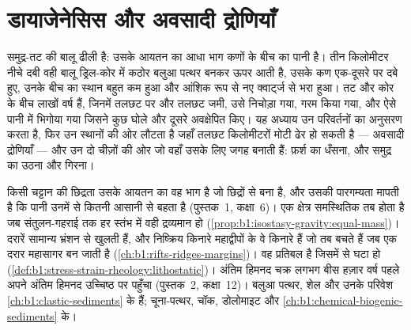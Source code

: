 \chapter{डायाजेनेसिस और अवसादी द्रोणियाँ}\label{ch:b1:diagenesis-basins}

समुद्र-तट की बालू ढीली है: उसके आयतन का आधा भाग कणों के बीच का पानी है। तीन किलोमीटर नीचे दबी वही बालू ड्रिल-कोर में कठोर बलुआ पत्थर बनकर ऊपर आती है, उसके कण एक-दूसरे पर दबे हुए, उनके बीच का स्थान बहुत कम हुआ और आंशिक रूप से नए क्वार्ट्ज से भरा हुआ। तट और कोर के बीच लाखों वर्ष हैं, जिनमें तलछट पर और तलछट जमी, उसे निचोड़ा गया, गरम किया गया, और ऐसे पानी में भिगोया गया जिसने कुछ  घोले और दूसरे अवक्षेपित किए। यह अध्याय उन परिवर्तनों का अनुसरण करता है, फिर उन स्थानों की ओर लौटता है जहाँ तलछट किलोमीटरों मोटी ढेर हो सकती है --- अवसादी द्रोणियाँ --- और उन दो चीज़ों की ओर जो वहाँ उसके लिए जगह बनाती हैं: फ़र्श का धँसना, और समुद्र का उठना और गिरना।

\begin{recall}
किसी चट्टान की छिद्रता उसके आयतन का वह भाग है जो छिद्रों से बना है, और उसकी पारगम्यता मापती है कि पानी उनमें से कितनी आसानी से बहता है (पुस्तक~1, कक्षा~6)। एक क्षेत्र समस्थितिक तब होता है जब संतुलन-गहराई तक हर स्तंभ में वही द्रव्यमान हो (\cref{prop:b1:isostasy-gravity:equal-mass})। दरारें सामान्य भ्रंशन से खुलती हैं, और निष्क्रिय किनारे महाद्वीपों के वे किनारे हैं जो तब बचते हैं जब एक दरार महासागर बन जाती है (\cref{ch:b1:rifts-ridges-margins})।  वह प्रतिबल है जिसमें से  घटा हो (\cref{def:b1:stress-strain-rheology:lithostatic})। अंतिम हिमनद चक्र लगभग बीस हज़ार वर्ष पहले अपने अंतिम हिमनद उच्चिष्ठ पर पहुँचा (पुस्तक~2, कक्षा~12)। बलुआ पत्थर, शेल और उनके परिवेश \cref{ch:b1:clastic-sediments} के हैं; चूना-पत्थर, चॉक, डोलोमाइट और  \cref{ch:b1:chemical-biogenic-sediments} के।
\end{recall}

